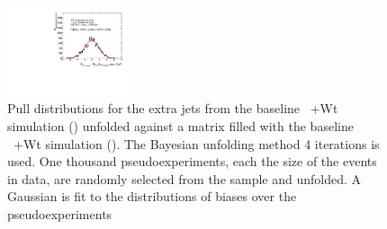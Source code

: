 \begin{figure}
\includegraphics[width=0.33\textwidth]{fig/UnfoldPull/SingleSlicePull15.pdf}
\caption{Pull distributions for the extra jets from the baseline \ttbar\ +Wt simulation (\powpy) unfolded against a matrix filled with the baseline \ttbar\ +Wt simulation (\powpy). The Bayesian unfolding method 4 iterations is used. One thousand pseudoexperiments, each the size of the events in data, are randomly selected from the sample and unfolded.  A Gaussian is fit to the distributions of biases over the pseudoexperiments}
\label{fig:appPull0}
\end{figure}
